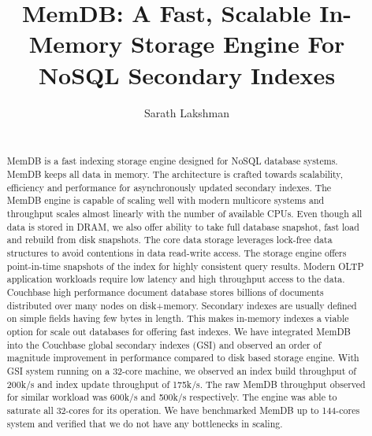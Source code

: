 \documentclass{vldb}
\begin{document}

\title{MemDB: A Fast, Scalable In-Memory Storage Engine For NoSQL Secondary Indexes}



\author{
\alignauthor
Sarath Lakshman\\
       \\
}

\maketitle

\begin{abstract}
MemDB is a fast indexing storage engine designed for NoSQL database systems. MemDB keeps all data in memory. The architecture is crafted towards scalability, efficiency and performance for asynchronously updated secondary indexes. The MemDB engine is capable of scaling well with modern multicore systems and throughput scales almost linearly with the number of available CPUs. Even though all data is stored in DRAM, we also offer ability to take full database snapshot, fast load and rebuild from disk snapshots. The core data storage leverages lock-free data structures to avoid contentions in data read-write access. The storage engine offers point-in-time snapshots of the index for highly consistent query results. Modern OLTP application workloads require low latency and high throughput access to the data. Couchbase high performance document database stores billions of documents distributed over many nodes on disk+memory. Secondary indexes are usually defined on simple fields having few bytes in length. This makes in-memory indexes a viable option for scale out databases for offering fast indexes.
    We have integrated MemDB into the Couchbase global secondary indexes (GSI) and observed an order of magnitude improvement in performance compared to disk based storage engine. With GSI system running on a 32-core machine, we observed an index build throughput of 200k/s and index update throughput of 175k/s. The raw MemDB throughput observed for similar workload was 600k/s and 500k/s respectively. The engine was able to saturate all 32-cores for its operation. We have benchmarked MemDB up to 144-cores system and verified that we do not have any bottlenecks in scaling.
\end{abstract}
\end{document}
